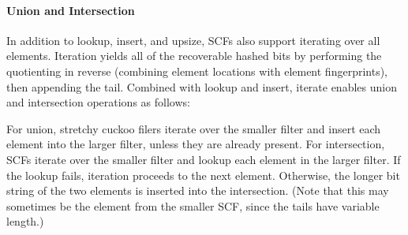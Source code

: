 \documentclass[letterpaper,twocolumn,10pt]{article}
\newcommand{\ints}{\mathbb{Z}}
\newcommand{\taffy}{stretchy}
\newcommand{\TCF}{SCF}
\newcommand{\taffy}{taffy}
\newcommand{\TCF}{TCF}
\begin{document}

\paragraph{Union and Intersection}
In addition to lookup, insert, and upsize, \TCF{}s also support iterating over all elements.
Iteration yields all of the recoverable hashed bits by performing the quotienting in reverse (combining element locations with element fingerprints), then appending the tail. %
Combined with lookup and insert, iterate enables union and intersection operations as follows:




For union, \taffy{} cuckoo filers iterate over the smaller filter and insert each element into the larger filter, unless they are already present.
For intersection, \TCF{}s iterate over the smaller filter and lookup each element in the larger filter.
If the lookup fails, iteration proceeds to the next element.
Otherwise, the longer bit string of the two elements is inserted into the intersection.
(Note that this may sometimes be the element from the smaller \TCF{}, since the tails have variable length.)
\end{document}
